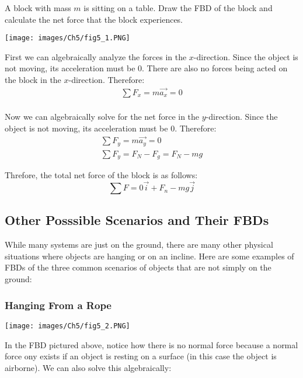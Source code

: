 \begin{problem}
	A block with mass $m$ is sitting on a table. Draw the FBD of the block and calculate the net force that the block experiences.

	\begin{center}\texttt{[image: images/Ch5/fig5\_1.PNG]}\end{center}

	First we can algebraically analyze the forces in the $x$-direction. Since the object is not moving, its acceleration must be 0. There are also no forces being acted on the block in the $x$-direction. Therefore:
	$$
		\begin{aligned}
			\sum F_x = m\vec{a_x} = 0\\
		\end{aligned}
	$$

	Now we can algebraically solve for the net force in the $y$-direction. Since the object is not moving, its acceleration must be 0. Therefore:
	$$
		\begin{aligned}
			\sum F_y = m\vec{a_y} = 0\\
			\sum F_y = F_N - F_g = F_N - mg
		\end{aligned}
	$$

	Threfore, the total net force of the block is as follows:
	$$
		\sum F = 0\vec{i} + F_n-mg \vec{j}
	$$
\end{problem}


\subsection{Other Posssible Scenarios and Their FBDs}

While many systems are just on the ground, there are many other physical situations where objects are hanging or on an incline. Here are some examples of FBDs of the three common scenarios of objects that are not simply on the ground:

\subsubsection*{Hanging From a Rope}

\begin{center}\texttt{[image: images/Ch5/fig5\_2.PNG]}\end{center}

In the FBD pictured above, notice how there is no normal force because a normal force ony exists if an object is resting on a surface (in this case the object is airborne). We can also solve this algebraically:

